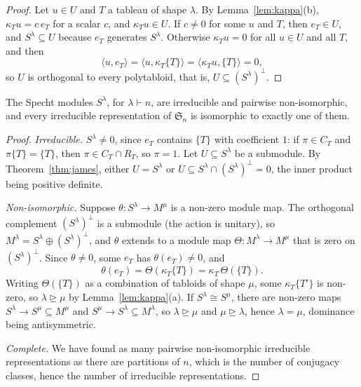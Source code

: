 \begin{proof}
Let $u\in U$ and $T$ a tableau of shape $\lambda$. By Lemma~\ref{lem:kappa}(b), $\kappa_Tu=c\,e_T$ for a scalar $c$, and $\kappa_Tu\in U$. If $c\ne0$ for some $u$ and $T$, then $e_T\in U$, and $S^\lambda\subseteq U$ because $e_T$
generates $S^\lambda$. Otherwise $\kappa_Tu=0$ for all $u\in U$ and all $T$, and then
\[
\langle u,e_T\rangle=\langle u,\kappa_T\{T\}\rangle=\langle\kappa_Tu,\{T\}\rangle=0,
\]
so $U$ is orthogonal to every polytabloid, that is, $U\subseteq(S^\lambda)^\perp$.
\end{proof}

\begin{theorem}\label{thm:specht}
The Specht modules $S^\lambda$, for $\lambda\vdash n$, are irreducible and pairwise non-isomorphic, and every irreducible representation of $\mathfrak S_n$ is isomorphic to exactly one of them.
\end{theorem}

\begin{proof}
\emph{Irreducible.} $S^\lambda\ne0$, since $e_T$ contains $\{T\}$ with coefficient $1$: if $\pi\in C_T$ and $\pi\{T\}=\{T\}$, then $\pi\in C_T\cap R_T$, so $\pi=1$. Let $U\subseteq S^\lambda$ be a submodule. By Theorem~\ref{thm:james}, either $U=S^\lambda$
or $U\subseteq S^\lambda\cap(S^\lambda)^\perp=0$, the inner product being positive definite.

\emph{Non-isomorphic.} Suppose $\theta:S^\lambda\to M^\mu$ is a non-zero module map. The orthogonal complement $(S^\lambda)^\perp$ is a submodule (the action is unitary), so $M^\lambda=S^\lambda\oplus(S^\lambda)^\perp$, and $\theta$ extends to a module
map $\Theta:M^\lambda\to M^\mu$ that is zero on $(S^\lambda)^\perp$. Since $\theta\ne0$, some $e_T$ has $\theta(e_T)\ne0$, and
\[
\theta(e_T)=\Theta(\kappa_T\{T\})=\kappa_T\,\Theta(\{T\}).
\]
Writing $\Theta(\{T\})$ as a combination of tabloids of shape $\mu$, some $\kappa_T\{T'\}$ is non-zero, so $\lambda\trianglerighteq\mu$ by Lemma~\ref{lem:kappa}(a). If $S^\lambda\cong S^\mu$, there are non-zero maps $S^\lambda\to S^\mu\subseteq M^\mu$ and
$S^\mu\to S^\lambda\subseteq M^\lambda$, so $\lambda\trianglerighteq\mu$ and $\mu\trianglerighteq\lambda$, hence $\lambda=\mu$, dominance being antisymmetric.

\emph{Complete.} We have found as many pairwise non-isomorphic irreducible representations as there are partitions of $n$, which is the number of conjugacy classes, hence the number of irreducible representations.
\end{proof}

